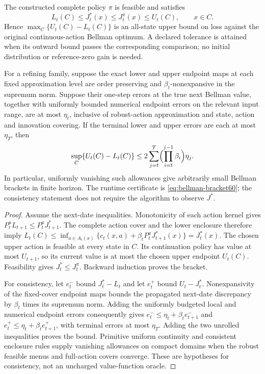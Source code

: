 \begin{theorem}\label{thm:bellman-bracket60}
The constructed complete policy $\pi$ is feasible and satisfies
\begin{equation}\label{eq:bellman-bracket60}
 L_t(C)\le J_t^*(x)\le J_t^\pi(x)\le U_t(C),\qquad x\in C.
\end{equation}
Hence $\max_C\{U_t(C)-L_t(C)\}$ is an all-state upper bound on loss against the original continuous-action Bellman optimum. A declared tolerance is attained when its outward bound passes the corresponding comparison; no initial distribution or reference-zero gain is needed.

For a refining family, suppose the exact lower and upper endpoint maps at each fixed approximation level are order preserving and $\beta_t$-nonexpansive in the supremum norm. Suppose their one-step errors at the true next Bellman value, together with uniformly bounded numerical endpoint errors on the relevant input range, are at most $\eta_t$, inclusive of robust-action approximation and state, action and innovation covering. If the terminal lower and upper errors are each at most $\eta_T$, then
\[
 \sup_C\{U_t(C)-L_t(C)\}
 \le 2\sum_{j=t}^{T}\Bigl(\prod_{i=t}^{j-1}\beta_i\Bigr)\eta_j.
\]
In particular, uniformly vanishing such allowances give arbitrarily small Bellman brackets in finite horizon. The runtime certificate is \eqref{eq:bellman-bracket60}; the consistency statement does not require the algorithm to observe $J^*$.
\end{theorem}
\begin{proof}
Assume the next-date inequalities. Monotonicity of each action kernel gives $P_t^aL_{t+1}\le P_t^aJ_{t+1}^*$. The complete action cover and the lower enclosure therefore imply $L_t(C)\le\inf_{a\in A_t(x)}\{c_t(x,a)+\beta_tP_t^aJ_{t+1}^*(x)\}=J_t^*(x)$. The chosen upper action is feasible at every state in $C$. Its continuation policy has value at most $U_{t+1}$, so its current value is at most the chosen upper endpoint $U_t(C)$. Feasibility gives $J_t^*\le J_t^\pi$. Backward induction proves the bracket.

For consistency, let $e_t^-$ bound $J_t^*-L_t$ and let $e_t^+$ bound $U_t-J_t^*$. Nonexpansivity of the fixed-cover endpoint maps bounds the propagated next-date discrepancy by $\beta_t$ times its supremum norm. Adding the uniformly budgeted local and numerical endpoint errors consequently gives $e_t^-\le\eta_t+\beta_te_{t+1}^-$ and $e_t^+\le\eta_t+\beta_te_{t+1}^+$, with terminal errors at most $\eta_T$. Adding the two unrolled inequalities proves the bound. Primitive uniform continuity and consistent enclosure rules supply vanishing allowances on compact domains when the robust feasible menus and full-action covers converge. These are hypotheses for consistency, not an uncharged value-function oracle.
\end{proof}

